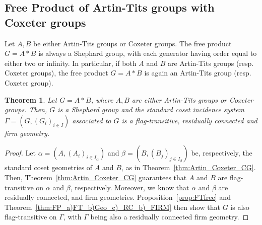 \documentclass[11pt,letterpaper]{amsart}
\newtheorem{thm}[prop]{Theorem}
\begin{document}
\subsection{Free Product of Artin-Tits groups with Coxeter groups}\label{sec:subsec:ProductArtinCoxeter}

Let $A,B$ be either Artin-Tits groups or  Coxeter groups.
The free product $G = A*B$ is always a Shephard group, with each generator having order equal to either two or infinity. In particular, if both $A$ and $B$ are Artin-Tits groups (resp. Coxeter groups), the free product $G = A * B$ is again an Artin-Tits group (resp. Coxeter group). 

\begin{thm}\label{thm:FreeProductArtinCoxeter}
    Let $G = A* B$, where $A,B$ are either Artin-Tits groups or Coxeter groups. Then, $G$ is a Shephard group and the standard coset incidence system $\Gamma = (G,(G_i)_{i\in I})$ associated to $G$ is a flag-transitive, residually connected and firm geometry. 
\end{thm}

\begin{proof}
     Let $\alpha=(A,(A_i)_{i\in I_\alpha})$ and $\beta=(B,(B_j)_{j\in I_\beta})$ be, respectively, the standard coset geometries of $A$ and $B$, as in Theorem~\ref{thm:Artin_Coxeter_CG}. Then, Theorem~\ref{thm:Artin_Coxeter_CG} guarantees that $A$ and $B$ are flag-transitive on $\alpha$ and $\beta$, respectively. Moreover, we know that $\alpha$ and $\beta$ are residually connected, and firm geometries. Proposition~\ref{prop:FTfree} and Theorem~\ref{thm:FP_a)FT_b)Geo_c)_RC_b)_FIRM} then show that $G$ is also flag-transitive on $\Gamma$, with $\Gamma$ being also a residually connected firm geometry. 
\end{proof}
\end{document}
